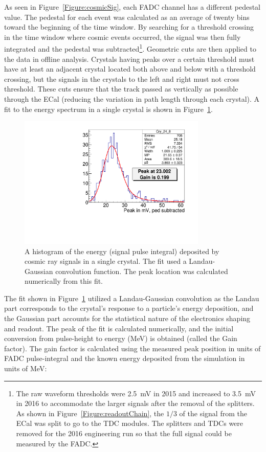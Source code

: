 As seen in Figure~\ref{Figure:cosmicSig}, each FADC channel has a different pedestal value. The pedestal for each event was calculated as an average of twenty bins toward the beginning of the time window. By searching for a threshold crossing in the time window where cosmic events occurred, the signal was then fully integrated and the pedestal was subtracted\footnote{The raw waveform thresholds were 2.5~mV in 2015 and increased to 3.5~mV in 2016 to accommodate the larger signals after the removal of the splitters. As shown in Figure~\ref{Figure:readoutChain}, the $1/3$ of the signal from the ECal was split to go to the TDC modules. The splitters and TDCs were removed for the 2016 engineering run so that the full signal could be measured by the FADC.}. Geometric cuts are then applied to the data in offline analysis. Crystals having peaks over a certain threshold must have at least an adjacent crystal located both above and below with a threshold crossing, but the signals in the crystals to the left and right must not cross threshold. These cuts ensure that the track passed as vertically as possible through the ECal (reducing the variation in path length through each crystal). A fit to the energy spectrum in a single crystal is shown in Figure~\ref{Figure:cosmicFit}.\\
\begin{figure}[htb]
  \centering
      \includegraphics[width=0.8\textwidth]{pics/performance/cosmicFitExample2015.pdf}
  \caption[Integrated cosmic signal in ECal fitted for calibration]{A histogram of the energy (signal pulse integral) deposited by cosmic ray signals in a single crystal. The fit used a Landau-Gaussian convolution function. The peak location was calculated numerically from this fit.}
  \label{Figure:cosmicFit}
\end{figure}
The fit shown in Figure~\ref{Figure:cosmicFit} utilized a Landau-Gaussian convolution as the Landau part corresponds to the crystal's response to a particle's energy deposition, and the Gaussian part accounts for the statistical nature of the electronics shaping and readout. The peak of the fit is calculated numerically, and the initial conversion from pulse-height to energy (MeV) is obtained (called the Gain factor). The gain factor is calculated using the measured peak position in units of FADC pulse-integral and the known energy deposited from the simulation in units of MeV:

